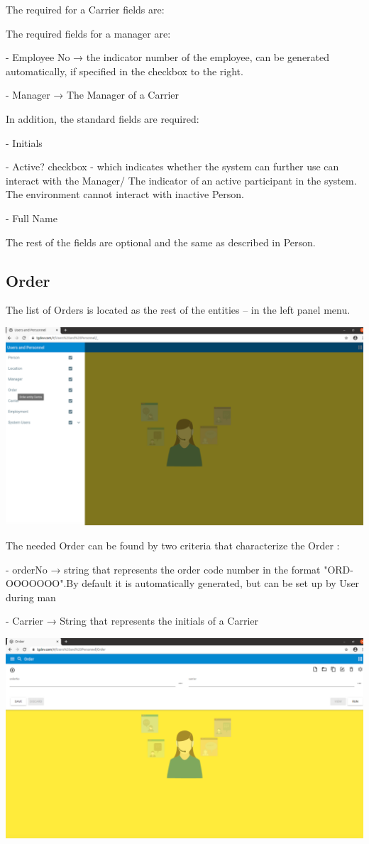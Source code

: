 The required for a Carrier fields are: 

The required fields for a manager are:

- Employee No → the indicator number of the employee, can be generated automatically, if specified in the checkbox to the right.

- Manager → The Manager of a Carrier

In addition, the standard fields are required:

- Initials

- Active? checkbox - which indicates whether the system can further use can interact with the Manager/ The indicator of an active participant in the system. The environment cannot interact with inactive Person.

- Full Name

The rest of the fields are optional and the same as described in Person.

\subsection{Order}

The list of Orders is located as the rest of the entities -- in the left panel menu. 

\includegraphics[width=\textwidth]{sections/01-chapter/images/order1.png}

The needed Order can be found by two criteria that characterize the Order : 

- orderNo → string that represents the order code number in the format "ORD-OOOOOOO".By default it is automatically generated, but can be set up by User during man

- Carrier → String that represents the initials of a  Carrier

\includegraphics[width=\textwidth]{sections/01-chapter/images/order2.png}

